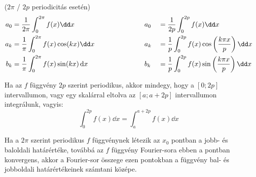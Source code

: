 \documentclass[a4paper, 12pt]{scrartcl}
\begin{document}
\begin{blueBox}
   ($2\pi$ / $2p$ periodicitás esetén)
  \begin{alignat*}{9}
    a_0 & =
    \frac{1}{2\pi} \int_0^{2\pi} f(x) \dd x
        &   & a_0
        &   & =
    \frac{1}{2p} \int_0^{2p} f(x) \dd x
    \\
    a_k & =
    \frac{1}{\pi} \int_0^{2\pi} f(x) \cos(k x) \dd x
    \hspace{2.2cm}
        &   & a_k
        &   & =
    \frac{1}{p} \int_0^{2p} f(x) \cos \left( \frac{k \pi x}{p} \right) \dd x
    \\
    b_k & =
    \frac{1}{\pi} \int_0^{2\pi} f(x) \sin(k x) \, \mathrm d x
        &   & b_k
        &   & =
    \frac{1}{p} \int_0^{2p} f(x) \sin \left( \frac{k \pi x}{p} \right) \dd x
  \end{alignat*}
\end{blueBox}

\begin{note}
  Ha az $f$ függvény $2p$ szerint periodikus, akkor mindegy, hogy a $[0; 2p]$
  intervallumon, vagy egy skalárral eltolva az $[a; a+2p]$ intervallumon
  integrálunk, vagyis:
  $$
    \int_0^{2p} f(x) \dd x = \int_a^{a+2p} f(x) \dd x
  $$
\end{note}

\begin{theorem}
  Ha a $2\pi$ szerint periodikus $f$ függvénynek létezik az $x_0$ pontban a
  jobb- és baloldali határértéke, továbbá az $f$ függvény Fourier-sora ebben a
  pontban konvergens, akkor a Fourier-sor összege ezen pontokban a függvény
  bal- és jobboldali határértékeinek számtani középe.
\end{theorem}
\end{document}
